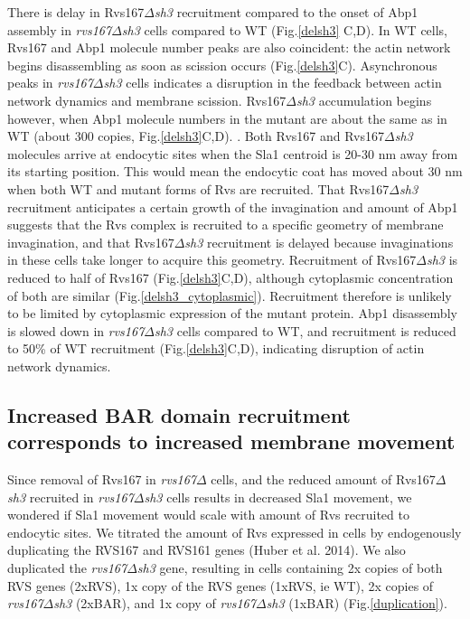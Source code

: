 \documentclass[9pt,lineno]{elife}
\begin{document}
There is delay in Rvs167\textit{$\Delta$sh3} recruitment compared to the onset of Abp1 assembly in \textit{rvs167$\Delta$sh3} cells compared to WT (Fig.\ref{delsh3} C,D). In WT cells, Rvs167 and Abp1 molecule number peaks are also coincident: the actin network begins disassembling as soon as scission occurs (Fig.\ref{delsh3}C). Asynchronous peaks in \textit{rvs167$\Delta$sh3} cells indicates a disruption in the feedback between actin network dynamics and membrane scission. Rvs167\textit{$\Delta$sh3} accumulation begins however, when Abp1 molecule numbers in the mutant are about the same as in WT (about 300 copies, Fig.\ref{delsh3}C,D). . Both Rvs167 and Rvs167\textit{$\Delta$sh3} molecules arrive at endocytic sites when the Sla1 centroid is 20-30 nm away from its starting position. This would mean the endocytic coat has moved about 30 nm when both WT and mutant forms of Rvs are recruited. That Rvs167\textit{$\Delta$sh3} recruitment anticipates a certain growth of the invagination and amount of Abp1 suggests that the Rvs complex is recruited to a specific geometry of membrane invagination, and that Rvs167\textit{$\Delta$sh3} recruitment is delayed because invaginations in these cells take longer to acquire this geometry. Recruitment of Rvs167\textit{$\Delta$sh3}  is reduced to half of Rvs167 (Fig.\ref{delsh3}C,D), although cytoplasmic concentration of both are similar (Fig.\ref{delsh3_cytoplasmic}). Recruitment therefore is unlikely to be limited by cytoplasmic expression of the mutant protein. Abp1 disassembly is slowed down in \textit{rvs167$\Delta$sh3} cells compared to WT, and recruitment is reduced to 50\% of WT recruitment (Fig.\ref{delsh3}C,D), indicating disruption of actin network dynamics.



\subsection{Increased BAR domain recruitment corresponds to increased membrane movement}
Since removal of Rvs167 in \textit{rvs167$\Delta$}  cells, and the reduced amount of Rvs167\textit{$\Delta$sh3}  recruited in \textit{rvs167$\Delta$sh3} cells results in decreased Sla1 movement, we wondered if Sla1 movement would scale with amount of Rvs recruited to endocytic sites. We titrated the amount of Rvs expressed in cells by endogenously duplicating the RVS167 and RVS161 genes (Huber et al. 2014). We also duplicated the  \textit{rvs167$\Delta$sh3} gene, resulting in cells containing 2x copies of both RVS genes (2xRVS), 1x copy of the RVS genes (1xRVS, ie WT), 2x copies of \textit{rvs167$\Delta$sh3} (2xBAR), and 1x copy of \textit{rvs167$\Delta$sh3} (1xBAR) (Fig.\ref{duplication}).
\end{document}

